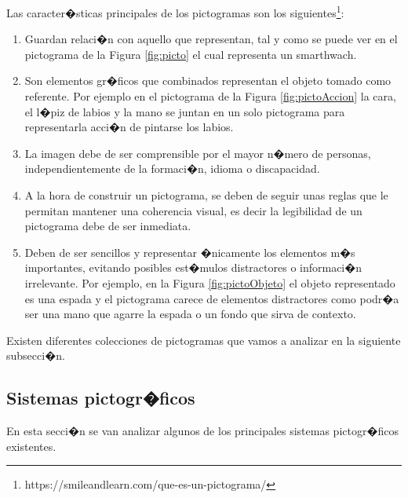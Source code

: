 Las caracter�sticas principales de los pictogramas son los siguientes\footnote{https://smileandlearn.com/que-es-un-pictograma/}:
 \begin{enumerate}

 \item Guardan relaci�n con aquello que representan, tal y como se puede ver en el pictograma de la Figura \ref{fig:picto} el cual representa un smarthwach.

 \item Son elementos gr�ficos que combinados representan el objeto tomado como referente. Por ejemplo en el pictograma de la Figura \ref{fig:pictoAccion} la cara, el l�piz de labios y la mano se juntan en un solo pictograma para representarla acci�n de pintarse los labios.
 

 \item La imagen debe de ser comprensible por el mayor n�mero de personas, independientemente de la formaci�n, idioma o discapacidad. 
 

 \item A la hora de construir un pictograma, se deben de seguir unas reglas que le permitan mantener una coherencia visual, es decir la legibilidad de un pictograma debe de ser inmediata.  

\item Deben de ser sencillos y representar �nicamente los elementos m�s importantes, evitando posibles est�mulos distractores o informaci�n irrelevante. Por ejemplo, en la Figura \ref{fig:pictoObjeto} el objeto representado es una espada y el pictograma carece de elementos distractores como podr�a ser una mano que agarre la espada o un fondo que sirva de contexto.

\end{enumerate}

Existen diferentes colecciones de pictogramas que vamos a analizar en la siguiente subsecci�n. 

\subsection{Sistemas pictogr�ficos}

En esta secci�n se van analizar algunos de los principales sistemas pictogr�ficos existentes.
